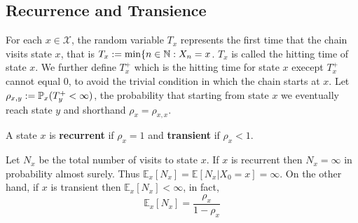 \documentclass[11pt]{scrartcl}
\begin{document}
\subsection{Recurrence and Transience}
For each $x\in \mathcal{X} $, the random variable $T_{x} $ represents the first
time that the chain visits state $x$, that is $T_{x}:= \min \{n\in \mathbb{N}: X_{n}
  = x $. $T_{x} $ is called the hitting time of state $x$. We further define
  $T_{x}^{+}  $ which is the hitting time for state $x$ execept $T_{x}^{+}
  $ cannot equal 0, to avoid the trivial condition in which the chain starts at
  $x$. 
  Let $\rho_{x,y}:=\mathbb{P}_x(T_{y}^{+} < \infty  )$, the probability that starting
  from state $x$ we eventually reach state $y$ and shorthand
  $\rho_{x}=\rho_{x,x}  $. 
  \begin{definition}
    A state $x$ is \textbf{recurrent}  if $\rho_{x}=1 $ and \textbf{transient}
  if $\rho_{x}<1 $.
  \end{definition}
  \begin{proposition}
    Let $N_{x} $ be the total number of visits to state $x$. If $x$ is
    recurrent then $N_{x}=\infty $ in probability almost surely. Thus
    $\mathbb{E}_{x} [N_{x} ] = \mathbb{E} [N_{x} | X_{0}=x  ] =\infty$. On
    the other hand, if $x$ is transient then $\mathbb{E}_{x} [N_{x}
    ] < \infty$, in fact, \[
      \mathbb{E}_{x} [N_{x} ]  = \frac{\rho_{x}}{1-\rho_{x}}
    \]  
  \end{proposition}
\end{document}
